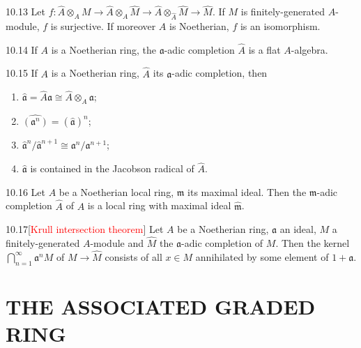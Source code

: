 \begin{proposition}{10.13}
	Let $f:\hat{A}\otimes_AM\rightarrow\hat{A}\otimes_A\hat{M}\rightarrow\hat{A}\otimes_{\hat{A}}\hat{M}\rightarrow\hat{M}$. If $M$ is finitely-generated $A$-module, $f$ is surjective. If moreover $A$ is Noetherian, $f$ is an isomorphism.
\end{proposition}

\begin{proposition}{10.14}
	If $A$ is a Noetherian ring, the $\mathfrak{a}$-adic completion $\hat{A}$ is a flat $A$-algebra.
\end{proposition}

\begin{proposition}{10.15}
	If $A$ is a Noetherian ring, $\hat{A}$ its $\mathfrak{a}$-adic completion, then
	\begin{enumerate}[label=\textup{(\roman*)},ref=\thepropositiontemp(\roman*)]
		\item\label{10.15.1} $\hat{\mathfrak{a}}=\hat{A}\mathfrak{a}\cong\hat{A}\otimes_A\mathfrak{a}$;
		\item\label{10.15.2} $\widehat{\left(\mathfrak{a}^n\right)}=\left(\hat{\mathfrak{a}}\right)^n$;
		\item\label{10.15.3} $\hat{\mathfrak{a}}^n/\hat{\mathfrak{a}}^{n+1}\cong\mathfrak{a}^n/\mathfrak{a}^{n+1}$;
		\item\label{10.15.4} $\hat{\mathfrak{a}}$ is contained in the Jacobson radical of $\hat{A}$.
	\end{enumerate}
\end{proposition}

\begin{proposition}{10.16}
	Let $A$ be a Noetherian local ring, $\mathfrak{m}$ its maximal ideal. Then the $\mathfrak{m}$-adic completion $\hat{A}$ of $A$ is a local ring with maximal ideal $\hat{\mathfrak{m}}$.
\end{proposition}

\begin{proposition}{10.17}[\textcolor{red}{Krull intersection theorem}]
	Let $A$ be a Noetherian ring, $\mathfrak{a}$ an ideal, $M$ a finitely-generated $A$-module and $\hat{M}$ the $\mathfrak{a}$-adic completion of $M$. Then the kernel $\bigcap_{n=1}^\infty\mathfrak{a}^nM$ of $M\rightarrow\hat{M}$ consists of all $x\in M$ annihilated by some element of $1+\mathfrak{a}$.
\end{proposition}

\section*{THE ASSOCIATED GRADED RING}

